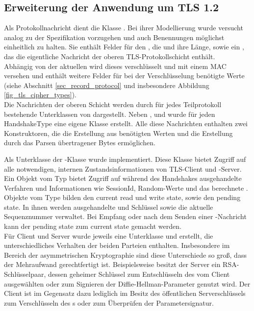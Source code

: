 \subsection{Erweiterung der Anwendung um TLS 1.2}


Als Protokollnachricht dient die Klasse . Bei ihrer Modellierung wurde versucht analog zu der Spezifikation vorzugehen und auch Benennungen möglichst einheitlich zu halten. Sie enthält Felder für den , die  und ihre Länge, sowie ein , das die eigentliche Nachricht der oberen TLS-Protokollschicht enthält. \\
Abhängig von der aktuellen \ciphersuite{} wird dieses  verschlüsselt und mit einem MAC versehen und enthält weitere Felder für bei der Verschlüsselung benötigte Werte (siehe Abschnitt \ref{sec_record_protocol} und insbesondere Abbildung \ref{fig_tls_cipher_types}). \\
Die Nachrichten der oberen Schicht werden durch für jedes Teilprotokoll bestehende Unterklassen von  dargestellt. Neben ,  und  wurde für jeden HandshakeType eine eigene Klasse erstellt. Alle diese Nachrichten enthalten zwei Konstruktoren, die die Erstellung aus benötigten Werten und die Erstellung durch das Parsen übertragener Bytes ermöglichen. 


Als Unterklasse der -Klasse wurde  implementiert. Diese Klasse bietet Zugriff auf alle notwendigen, internen Zustandsinformationen von TLS-Client und -Server. Ein Objekt vom Typ  bietet Zugriff auf während des Handshakes ausgehandelte Verfahren und Informationen wie SessionId, Random-Werte und das berechnete \mastersecret{}. Objekte vom Type  bilden den current read und write state, sowie den pending state.  In ihnen werden ausgehandelte \ciphersuite{} und Schlüssel sowie die aktuelle Sequenznummer verwaltet. Bei Empfang oder nach dem Senden einer \changecipherspec{}-Nachricht kann der pending state zum current state gemacht werden.\\
Für Client und Server wurde jeweils eine Unterklasse  und  erstellt, die unterschiedliches Verhalten der beiden Parteien enthalten. Insbesondere im Bereich der asymmetrischen Kryptographie sind diese Unterschiede so groß, dass der Mehraufwand gerechtfertigt ist. Beispielsweise besitzt der Server ein RSA-Schlüsselpaar, dessen geheimer Schlüssel zum Entschlüsseln des vom Client ausgewählten \premastersecret{} oder zum Signieren der Diffie-Hellman-Parameter genutzt wird. Der Client ist im Gegensatz dazu lediglich im Besitz des öffentlichen Serverschlüssels zum Verschlüsseln des \premastersecret{}s oder zum Überprüfen der Parametersignatur.

